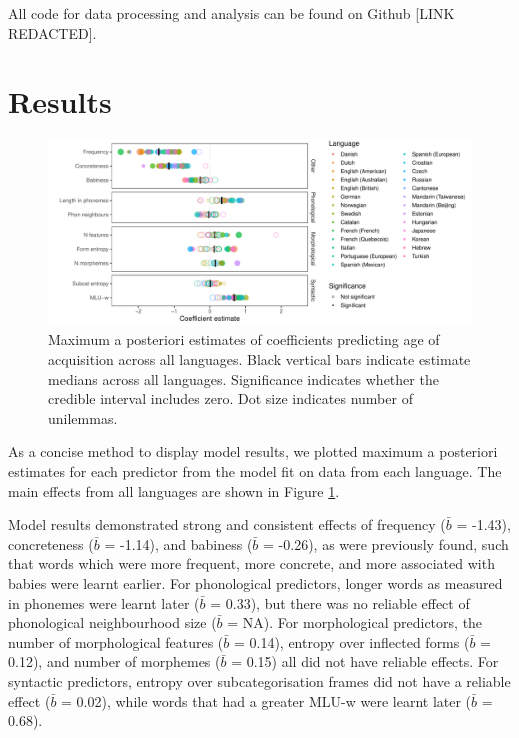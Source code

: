 \documentclass[10pt, letterpaper]{article}
\newenvironment{CodeChunk}{}{}
\begin{document}
All code for data processing and analysis can be found on Github {[}LINK
REDACTED{]}.

\hypertarget{results}{%
\section{Results}\label{results}}

\begin{CodeChunk}
\begin{figure}[ht]

{\centering \includegraphics[width=500px]{figs/big_plot-1} 

}

\caption[Maximum a posteriori estimates of coefficients predicting age of acquisition across all languages]{Maximum a posteriori estimates of coefficients predicting age of acquisition across all languages. Black vertical bars indicate estimate medians across all languages. Significance indicates whether the credible interval includes zero. Dot size indicates number of unilemmas.}\label{fig:big_plot}
\end{figure}
\end{CodeChunk}

As a concise method to display model results, we plotted maximum a
posteriori estimates for each predictor from the model fit on data from
each language. The main effects from all languages are shown in Figure
\ref{fig:big_plot}.

Model results demonstrated strong and consistent effects of frequency
(\(\bar{b}\) = -1.43), concreteness (\(\bar{b}\) = -1.14), and babiness
(\(\bar{b}\) = -0.26), as were previously found, such that words which
were more frequent, more concrete, and more associated with babies were
learnt earlier. For phonological predictors, longer words as measured in
phonemes were learnt later (\(\bar{b}\) = 0.33), but there was no
reliable effect of phonological neighbourhood size (\(\bar{b}\) = NA).
For morphological predictors, the number of morphological features
(\(\bar{b}\) = 0.14), entropy over inflected forms (\(\bar{b}\) = 0.12),
and number of morphemes (\(\bar{b}\) = 0.15) all did not have reliable
effects. For syntactic predictors, entropy over subcategorisation frames
did not have a reliable effect (\(\bar{b}\) = 0.02), while words that
had a greater MLU-w were learnt later (\(\bar{b}\) = 0.68).
\end{document}
